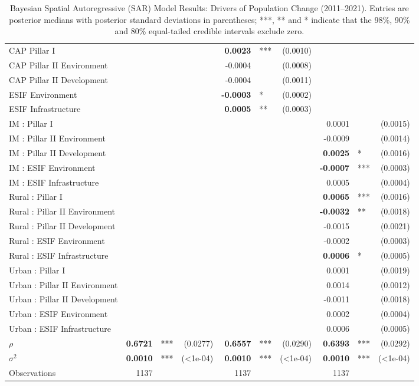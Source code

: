 \begin{table}[t]
\begin{tabular}{lrl@{~}r@{~~~~~}rl@{~}r@{~~~~~}rl@{~}r}
  CAP Pillar I &  &  &  & \textbf{0.0023} & *** & (0.0010) &  &  &  \\ 
  CAP Pillar II Environment &  &  &  & -0.0004 &  & (0.0008) &  &  &  \\ 
  CAP Pillar II Development &  &  &  & -0.0004 &  & (0.0011) &  &  &  \\ 
  ESIF Environment &  &  &  & \textbf{-0.0003} & * & (0.0002) &  &  &  \\ 
  ESIF Infrastructure &  &  &  & \textbf{0.0005} & ** & (0.0003) &  &  &  \\ 
  IM : Pillar I &  &  &  &  &  &  & 0.0001 &  & (0.0015) \\ 
  IM : Pillar II Environment &  &  &  &  &  &  & -0.0009 &  & (0.0014) \\ 
  IM : Pillar II Development &  &  &  &  &  &  & \textbf{0.0025} & * & (0.0016) \\ 
  IM : ESIF Environment &  &  &  &  &  &  & \textbf{-0.0007} & *** & (0.0003) \\ 
  IM : ESIF Infrastructure &  &  &  &  &  &  & 0.0005 &  & (0.0004) \\ 
  Rural : Pillar I &  &  &  &  &  &  & \textbf{0.0065} & *** & (0.0016) \\ 
  Rural : Pillar II Environment &  &  &  &  &  &  & \textbf{-0.0032} & ** & (0.0018) \\ 
  Rural : Pillar II Development &  &  &  &  &  &  & -0.0015 &  & (0.0021) \\ 
  Rural : ESIF Environment &  &  &  &  &  &  & -0.0002 &  & (0.0003) \\ 
  Rural : ESIF Infrastructure &  &  &  &  &  &  & \textbf{0.0006} & * & (0.0005) \\ 
  Urban : Pillar I &  &  &  &  &  &  & 0.0001 &  & (0.0019) \\ 
  Urban : Pillar II Environment &  &  &  &  &  &  & 0.0014 &  & (0.0012) \\ 
  Urban : Pillar II Development &  &  &  &  &  &  & -0.0011 &  & (0.0018) \\ 
  Urban : ESIF Environment &  &  &  &  &  &  & 0.0002 &  & (0.0004) \\ 
  Urban : ESIF Infrastructure &  &  &  &  &  &  & 0.0006 &  & (0.0005) \\ 
   \midrule
$\rho$ & \textbf{0.6721} & *** & (0.0277) & \textbf{0.6557} & *** & (0.0290) & \textbf{0.6393} & *** & (0.0292) \\ 
  $\sigma^2$ & \textbf{0.0010} & *** & (<1e-04) & \textbf{0.0010} & *** & (<1e-04) & \textbf{0.0010} & *** & (<1e-04) \\ 
  Observations & 1137 &  &  & 1137 &  &  & 1137 &  &  \\ 
   \bottomrule
\end{tabular}
\caption{Bayesian Spatial Autoregressive (SAR) Model Results: Drivers of Population Change (2011--2021). Entries are posterior medians with posterior standard deviations in parentheses; ***, ** and * indicate that the 98\%, 90\% and 80\% equal-tailed credible intervals exclude zero.} 
\label{tab:sar_main}
\end{table}

